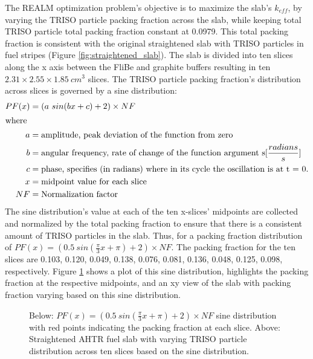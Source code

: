 The \gls{REALM} optimization problem's objective is to maximize the slab's 
$k_{eff}$, by varying the \gls{TRISO} particle packing fraction across the slab,
while keeping total \gls{TRISO} particle total packing fraction constant at 0.0979. 
This total packing fraction is consistent with the original straightened slab with 
TRISO particles in fuel stripes (Figure \ref{fig:straightened_slab}). 
The slab is divided into ten slices along the x axis between the FliBe and graphite 
buffers resulting in ten $2.31 \times 2.55 \times 1.85\ cm^3$ slices. 
The \gls{TRISO} particle packing fraction's distribution across slices is 
governed by a sine distribution: 
\begin{align}
    PF(x) &= (a\ sin(bx + c) + 2) \times NF\\
    \intertext{where}
    a &= \mbox{amplitude, peak deviation of the function from zero} \nonumber \\
    b &= \mbox{angular frequency, rate of change of the function argument s} [\frac{radians}{s}] \nonumber \\
    c &= \mbox{phase, specifies (in radians) where in its cycle the oscillation is at t = 0.} \nonumber \\
    x &= \mbox{midpoint value for each slice} \nonumber \\
    NF &= \mbox{Normalization factor} \nonumber
\end{align}
The sine distribution's value at each of the ten x-slices' midpoints are collected and 
normalized by the total packing fraction to ensure that there is a consistent 
amount of \gls{TRISO} particles in the slab. 
Thus, for a packing fraction distribution of 
$PF(x) = (0.5\ sin(\frac{\pi}{3}x + \pi) + 2)  \times NF$. 
The packing fraction for the ten slices are 0.103, 0.120, 0.049, 0.138, 
0.076, 0.081, 0.136, 0.048, 0.125, 0.098, respectively. 
Figure \ref{fig:triso_distribution} shows a plot of this sine distribution, highlights 
the packing fraction at the respective midpoints, and an xy view of the slab
with packing fraction varying based on this sine distribution. 
\begin{figure}[]
    \centering
    \caption{Below: $PF(x) = (0.5\ sin(\frac{\pi}{3}x + \pi) + 2)  \times NF$ 
    sine distribution with red points indicating the packing fraction at each slice. 
    Above: Straightened \acrlong{AHTR} fuel slab with varying \gls{TRISO} particle 
    distribution across ten slices based on the sine distribution. }
    \label{fig:triso_distribution}
\end{figure}
